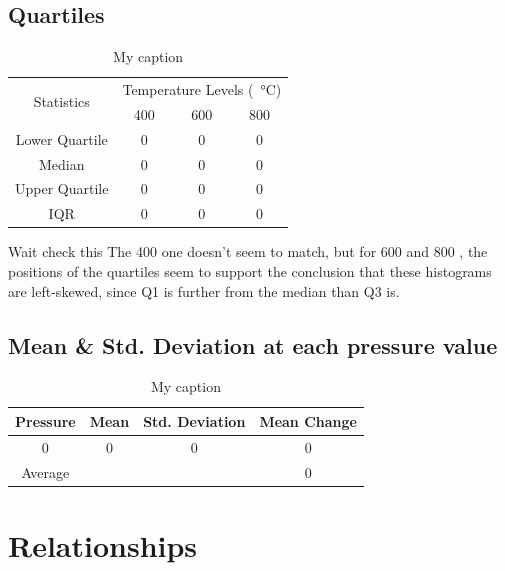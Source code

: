 \documentclass[letterpaper]{article}
\begin{document}
\subsection{Quartiles}

\begin{table}[H]
 \centering
 \begin{tabular}{c|c|c|c|}
  \multirow{2}{*}{Statistics} & \multicolumn{3}{c|}{Temperature Levels (\SI{}{\celsius})}             \\ \cline{2-4}
                              & 400                                                       & 600 & 800 \\ \hline
  Lower Quartile              & 0                                                         & 0   & 0   \\ \hline
  Median                      & 0                                                         & 0   & 0   \\ \hline
  Upper Quartile              & 0                                                         & 0   & 0   \\ \hline
  IQR                         & 0                                                         & 0   & 0   \\ \hline
 \end{tabular}
 \caption{My caption}
 \label{tempquart}
\end{table}

Wait check this
The 400  one doesn’t seem to match, but for 600  and 800 , the positions of the quartiles seem to support the conclusion that these histograms are left-skewed, since Q1 is further from the median than Q3 is.
\subsection{Mean \& Std. Deviation at each pressure value}

\begin{table}[H]
 \centering
 \begin{tabular}{c|c|c|c|}
  Pressure & Mean & Std. Deviation & Mean Change \\ \hline
  0        & 0    & 0              & 0           \\ \hline
  Average  &      &                & 0           \\ \hline
 \end{tabular}
 \caption{My caption}
 \label{pressurestat}
\end{table}

\section{Relationships}
\end{document}
